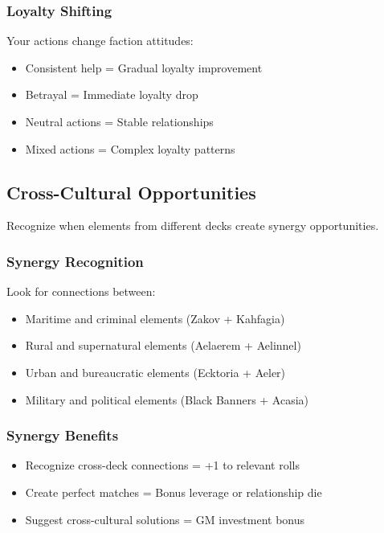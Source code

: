 \subsubsection{Loyalty Shifting}

Your actions change faction attitudes:
\begin{itemize}
\item Consistent help = Gradual loyalty improvement
\item Betrayal = Immediate loyalty drop
\item Neutral actions = Stable relationships
\item Mixed actions = Complex loyalty patterns
\end{itemize}

\subsection{Cross-Cultural Opportunities}

Recognize when elements from different decks create synergy opportunities.

\subsubsection{Synergy Recognition}

Look for connections between:
\begin{itemize}
\item Maritime and criminal elements (Zakov + Kahfagia)
\item Rural and supernatural elements (Aelaerem + Aelinnel)
\item Urban and bureaucratic elements (Ecktoria + Aeler)
\item Military and political elements (Black Banners + Acasia)
\end{itemize}

\subsubsection{Synergy Benefits}

\begin{itemize}
\item Recognize cross-deck connections = +1 to relevant rolls
\item Create perfect matches = Bonus leverage or relationship die
\item Suggest cross-cultural solutions = GM investment bonus
\end{itemize}

